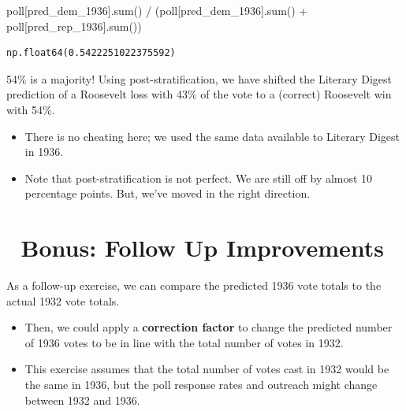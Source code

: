 \documentclass[
  letterpaper,
  DIV=11,
  numbers=noendperiod]{scrreprt}
\newenvironment{Shaded}{\begin{snugshade}}{\end{snugshade}}
\newcommand{\BuiltInTok}[1]{\textcolor[rgb]{0.00,0.23,0.31}{#1}}
\newcommand{\NormalTok}[1]{\textcolor[rgb]{0.00,0.23,0.31}{#1}}
\newcommand{\OperatorTok}[1]{\textcolor[rgb]{0.37,0.37,0.37}{#1}}
\newcommand{\StringTok}[1]{\textcolor[rgb]{0.13,0.47,0.30}{#1}}
\begin{document}
\begin{Shaded}
\begin{Highlighting}[]
\NormalTok{poll[}\StringTok{\textquotesingle{}pred\_dem\_1936\textquotesingle{}}\NormalTok{].}\BuiltInTok{sum}\NormalTok{() }\OperatorTok{/}\NormalTok{ (poll[}\StringTok{\textquotesingle{}pred\_dem\_1936\textquotesingle{}}\NormalTok{].}\BuiltInTok{sum}\NormalTok{() }\OperatorTok{+}\NormalTok{ poll[}\StringTok{\textquotesingle{}pred\_rep\_1936\textquotesingle{}}\NormalTok{].}\BuiltInTok{sum}\NormalTok{())}
\end{Highlighting}
\end{Shaded}

\begin{verbatim}
np.float64(0.5422251022375592)
\end{verbatim}

54\% is a majority! Using post-stratification, we have shifted the
Literary Digest prediction of a Roosevelt loss with 43\% of the vote to
a (correct) Roosevelt win with 54\%.

\begin{itemize}
\item
  There is no cheating here; we used the same data available to Literary
  Digest in 1936.
\item
  Note that post-stratification is not perfect. We are still off by
  almost 10 percentage points. But, we've moved in the right direction.
\end{itemize}

\section{🎁 Bonus: Follow Up
Improvements}\label{bonus-follow-up-improvements}

As a follow-up exercise, we can compare the predicted 1936 vote totals
to the actual 1932 vote totals.

\begin{itemize}
\item
  Then, we could apply a \textbf{correction factor} to change the
  predicted number of 1936 votes to be in line with the total number of
  votes in 1932.
\item
  This exercise assumes that the total number of votes cast in 1932
  would be the same in 1936, but the poll response rates and outreach
  might change between 1932 and 1936.
\end{itemize}
\end{document}
